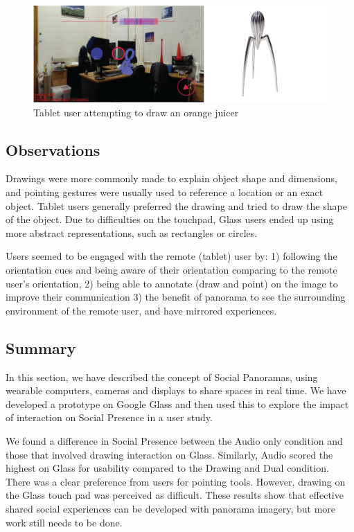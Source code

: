 \begin{figure}[ht]
	\centering
	\includegraphics[width=\linewidth]{images/ismar14/tablet-drawing}
	\caption{Tablet user attempting to draw an orange juicer}
	\label{fig:ismar14:tablet-drawing}
\end{figure}

\subsection{Observations}

Drawings were more commonly made to explain object shape and dimensions, and pointing gestures were usually used to reference a location or an exact object. Tablet users generally preferred the drawing and tried to draw the shape of the object. Due to difficulties on the touchpad, Glass users ended up using more abstract representations, such as rectangles or circles.

Users seemed to be engaged with the remote (tablet) user by: 1) following the orientation cues and being aware of their orientation comparing to the remote user's orientation, 2) being able to annotate (draw and point) on the image to improve their communication 3) the benefit of panorama to see the surrounding environment of the remote user, and have mirrored experiences.


\subsection{Summary}

In this section, we have described the concept of Social Panoramas, using wearable computers, cameras and displays to share spaces in real time. We have developed a prototype on Google Glass and then used this to explore the impact of interaction on Social Presence in a user study. 

We found a difference in Social Presence between the Audio only condition and those that involved drawing interaction on Glass. Similarly, Audio scored the highest on Glass for usability compared to the Drawing and Dual condition. There was a clear preference from users for pointing tools. However, drawing on the Glass touch pad was perceived as difficult. These results show that effective shared social experiences can be developed with panorama imagery, but more work still needs to be done.

